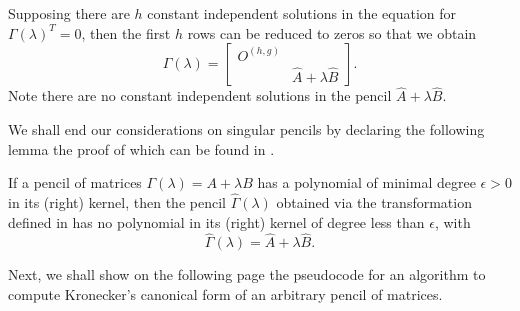 \begin{cs}
    Supposing there are \(h\) constant independent solutions in the equation for \(\Gamma(\lambda)^T = 0\), then the first
    \(h\) rows can be reduced to zeros so that we obtain
    \[
        \widehat{\Gamma}(\lambda) = \begin{bmatrix}
            O^{(h, g)} \\
            & \widehat{A} + \lambda \widehat{B}
        \end{bmatrix}.
    \]
    Note there are no constant independent solutions in the pencil \(\widehat{A} + \lambda \widehat{B}\).
\end{cs}
\vspace{5mm}

We shall end our considerations on singular pencils by declaring the following lemma the proof of which can be
found in \cite[pp. 32-33]{gantmacher}.
\begin{lemma}
    If a pencil of matrices \(\Gamma(\lambda) = A + \lambda B\) has a polynomial of minimal degree \(\epsilon > 0\)
    in its (right) kernel, then the pencil \(\widehat{\Gamma}(\lambda)\)
    obtained via the transformation defined in  has no polynomial in its (right)
    kernel of degree less than \(\epsilon\), with
    \[
        \widehat{\Gamma}(\lambda) = \widehat{A} + \lambda\widehat{B}.
    \]
\end{lemma}

Next, we shall show on the following page the pseudocode for an algorithm to compute Kronecker's canonical form of
an arbitrary pencil of matrices.

\pagebreak

